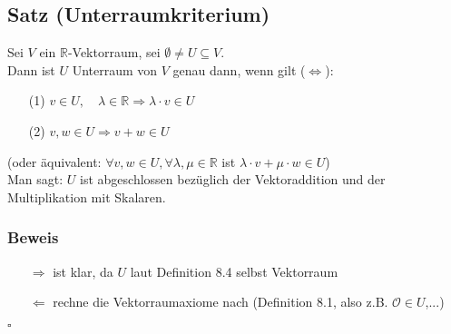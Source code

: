 \documentclass[12pt,titlepage]{article}
\newcommand{\R}{\mathds{R}}
\renewcommand{\>}{\rightarrow}
\renewcommand{\*}{\cdot}
\renewcommand{\O}{\mathcal{O}}
\begin{document}
	\subsection{Satz (Unterraumkriterium)}
	Sei $V$ ein $\R$-Vektorraum, sei $\emptyset\neq U\subseteq V$.\\
	Dann ist $U$ Unterraum von $V$ genau dann, wenn gilt ($\Leftrightarrow$):
	\begin{itemize}
		\item[(1)] $v\in U,\quad\lambda\in\R\Rightarrow\lambda\*v\in U$
		\item[(2)] $v,w\in U\Rightarrow v+w\in U$
	\end{itemize}
	(oder äquivalent: $\forall v,w\in U, \forall\lambda,\mu\in\R$ ist $\lambda\*v+\mu\*w\in U$)\\
	Man sagt: $U$ ist abgeschlossen bezüglich der Vektoraddition und der Multiplikation mit Skalaren.
	\subsubsection*{Beweis}
	\begin{itemize}
		\item[$\Rightarrow$] ist klar, da $U$ laut Definition 8.4 selbst Vektorraum
		\item[$\Leftarrow$] rechne die Vektorraumaxiome nach (Definition 8.1, also z.B. $\O\in U$,...)
	\end{itemize}
	\hfill$\square$
\end{document}
